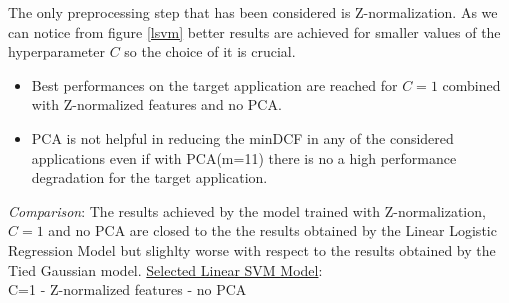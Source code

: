 \documentclass[10pt, a4paper, twocolumn]{article} %
\begin{document}
The only preprocessing step that has been considered is Z-normalization. As we can notice from figure \ref{lsvm}
better results are achieved for smaller values of the hyperparameter $C$ so the choice of it is crucial.
\begin{itemize}
	\item Best performances on the target application are reached for $C=1$ combined with
		  Z-normalized features and no PCA.
	\item PCA is not helpful in reducing the minDCF in any of the considered applications
		  even if with PCA(m=11) there is no a high performance degradation for the target
		  application.
\end{itemize}
\textit{Comparison}: The results achieved by the model trained with Z-normalization, 
$C=1$ and no PCA are closed to the the results obtained by the Linear Logistic Regression Model
but slighlty worse with respect to the results obtained by the Tied Gaussian model.
\underline{Selected Linear SVM Model}: \\C=1 - Z-normalized features - no PCA
\end{document}
